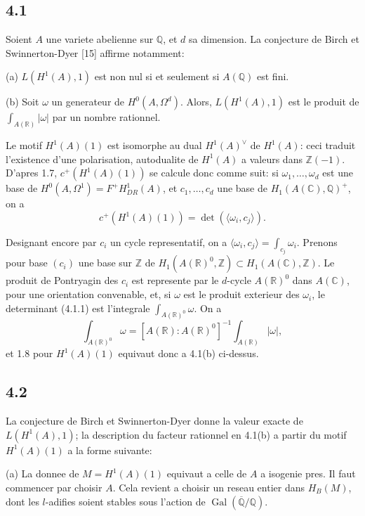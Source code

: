 \documentclass[12pt,a4paper]{article}
\theoremstyle{plain}
\theoremstyle{definition}
\theoremstyle{remark}
\DeclareMathOperator{\Gal}{Gal}
\newcommand{\Q}{\mathbb{Q}}
\newcommand{\R}{\mathbb{R}}
\newcommand{\C}{\mathbb{C}}
\newcommand{\Z}{\mathbb{Z}}
\begin{document}
\subsection*{4.1}

Soient $A$ une variete abelienne sur $\Q$, et $d$ sa dimension. La conjecture de
Birch et Swinnerton-Dyer [15] affirme notamment:

(a) $L(H^1(A), 1)$ est non nul si et seulement si $A(\Q)$ est fini.

(b) Soit $\omega$ un generateur de $H^0(A, \Omega^d)$. Alors, $L(H^1(A), 1)$ est le produit de
$\int_{A(\R)} |\omega|$ par un nombre rationnel.

Le motif $H^1(A)(1)$ est isomorphe au dual $H^1(A)^\vee$ de $H^1(A)$: ceci traduit l'existence
d'une polarisation, autodualite de $H^1(A)$ a valeurs dans $\Z(-1)$. D'apres 1.7,
$c^+(H^1(A)(1))$ se calcule donc comme suit: si $\omega_1, \ldots, \omega_d$ est une base de
$H^0(A, \Omega^1) = F^+ H^1_{DR}(A)$, et $c_1, \ldots, c_d$ une base de $H_1(A(\C), \Q)^+$, on a
\begin{equation}\label{eq:4.1.1}
c^+(H^1(A)(1)) = \det(\langle \omega_i, c_j \rangle).
\end{equation}

Designant encore par $c_i$ un cycle representatif, on a $\langle \omega_i, c_j \rangle = \int_{c_j} \omega_i$.
Prenons pour base $(c_i)$ une base sur $\Z$ de $H_1(A(\R)^0, \Z) \subset H_1(A(\C), \Z)$. Le
produit de Pontryagin des $c_i$ est represente par le $d$-cycle $A(\R)^0$ dans $A(\C)$, pour une
orientation convenable, et, si $\omega$ est le produit exterieur des $\omega_i$, le determinant
(4.1.1) est l'integrale $\int_{A(\R)^0} \omega$. On a
\[
\int_{A(\R)^0} \omega = [A(\R): A(\R)^0]^{-1} \int_{A(\R)} |\omega|,
\]
et 1.8 pour $H^1(A)(1)$ equivaut donc a 4.1(b) ci-dessus.

\subsection*{4.2}

La conjecture de Birch et Swinnerton-Dyer donne la valeur exacte de
$L(H^1(A), 1)$; la description du facteur rationnel en 4.1(b) a partir du motif $H^1(A)(1)$
a la forme suivante:

(a) La donnee de $M = H^1(A)(1)$ equivaut a celle de $A$ a isogenie pres. Il faut
commencer par choisir $A$. Cela revient a choisir un reseau entier dans $H_B(M)$, dont
les $l$-adifies soient stables sous l'action de $\Gal(\overline{\Q}/\Q)$.
\end{document}
